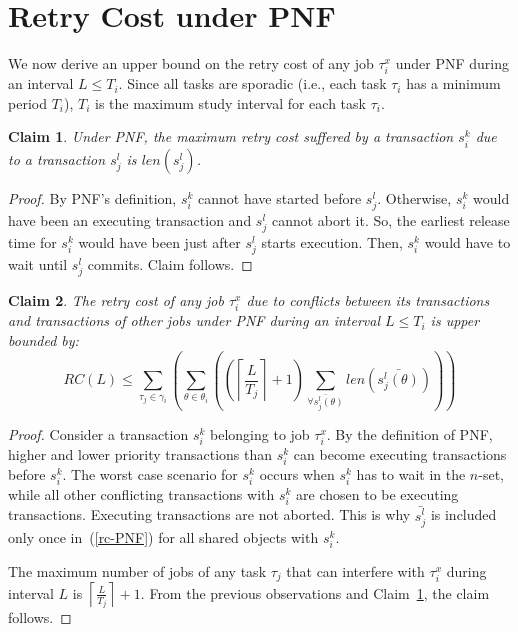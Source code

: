 \documentclass[twocolumn]{article}
\newtheorem{clm}{Claim}
\newtheorem{proof}{Proof}
\begin{document}
\section{Retry Cost under PNF}\label{rc pnf sec}

We now derive an upper bound on the retry cost of any job $\tau_i^x$ under PNF during an interval $L\le T_i$. Since all tasks are sporadic (i.e., each task $\tau_i$ has a minimum period $T_i$), $T_i$ is the maximum study interval for each task $\tau_i$.

\begin{clm}\label{two transactions retry cost PNF}
Under PNF, the maximum retry cost suffered by a transaction $s_{i}^{k}$ due 
to a transaction $s_{j}^{l}$ is $len(s_{j}^{l})$.
\end{clm}
\begin{proof}\normalfont
By PNF's definition, $s_{i}^{k}$ cannot have started before
$s_{j}^{l}$. Otherwise, $s_i^k$ would have been an executing transaction and $s_{j}^{l}$ cannot abort it. So, the earliest release time for $s_{i}^{k}$ would have been just after $s_{j}^{l}$ starts execution. Then, $s_i^k$ would have to wait until $s_{j}^{l}$
commits. Claim follows.
\end{proof}

\begin{clm}
The retry cost of any job $\tau_{i}^{x}$ due to conflicts between its transactions and transactions of other jobs under PNF during an interval $L\le T_{i}$ is upper bounded by:
\begin{equation}
RC(L)\le\sum_{\tau_{j}\in\gamma_{i}}\left(\sum_{\theta\in\theta_{i}}\left(\left(\left\lceil \frac{L}{T_{j}}\right\rceil +1\right)\sum_{\bar{\forall s_{j}^{l}(\theta)}}len\left(\bar{s_{j}^{l}(\theta)}\right)\right)\right)\label{rc-PNF}
\end{equation}
\end{clm}

\begin{proof}\normalfont
Consider a transaction $s_{i}^{k}$ belonging to job $\tau_{i}^{x}$. By the definition of PNF, higher and lower priority transactions than $s_i^k$ can become executing transactions before $s_i^k$. 
 The worst case scenario for $s_{i}^{k}$ occurs when $s_i^k$ has to wait in the $n$-set, while all other conflicting transactions with $s_i^k$ are chosen to be executing transactions. Executing transactions are not aborted. This is why $\bar{s_j^l}$ is included only once in~(\ref{rc-PNF}) for all shared objects with $s_i^k$.

The maximum number of jobs of any task $\tau_{j}$ that can interfere with $\tau_{i}^{x}$ during interval $L$ is $\left\lceil \frac{L}{T_{j}}\right\rceil +1$. From  the previous observations and Claim~\ref{two transactions retry cost PNF}, the claim follows.
\end{proof}
\end{document}
